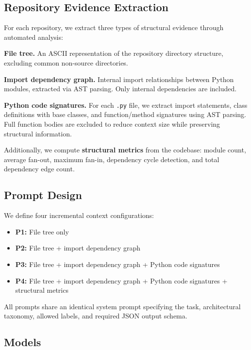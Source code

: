 \documentclass[runningheads]{llncs}
\begin{document}
\subsection{Repository Evidence Extraction}

For each repository, we extract three types of structural evidence through automated analysis:

\textbf{File tree.} An ASCII representation of the repository directory structure, excluding common non-source directories.

\textbf{Import dependency graph.} Internal import relationships between Python modules, extracted via AST parsing. Only internal dependencies are included.

\textbf{Python code signatures.} For each \texttt{.py} file, we extract import statements, class definitions with base classes, and function/method signatures using AST parsing. Full function bodies are excluded to reduce context size while preserving structural information.

Additionally, we compute \textbf{structural metrics} from the codebase: module count, average fan-out, maximum fan-in, dependency cycle detection, and total dependency edge count.

\subsection{Prompt Design}
\label{sec:prompts}

We define four incremental context configurations:

\begin{itemize}[nosep]
    \item \textbf{P1:} File tree only
    \item \textbf{P2:} File tree + import dependency graph
    \item \textbf{P3:} File tree + import dependency graph + Python code signatures
    \item \textbf{P4:} File tree + import dependency graph + Python code signatures + structural metrics
\end{itemize}

All prompts share an identical system prompt specifying the task, architectural taxonomy, allowed labels, and required JSON output schema.

\subsection{Models}
\label{sec:models}
\end{document}
